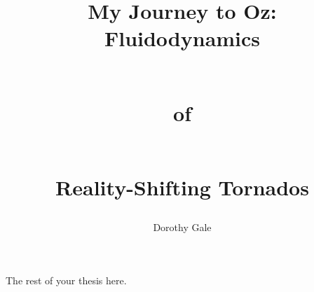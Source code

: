 \documentclass[11pt, a4paper, roman]{article}
\author{Dorothy Gale}
\title{My Journey to Oz:\\ Fluidodynamics\strut \\ of\strut \\ Reality-Shifting Tornados\strut}
\begin{document}
\maketitle

The rest of your thesis here.
\end{document}
